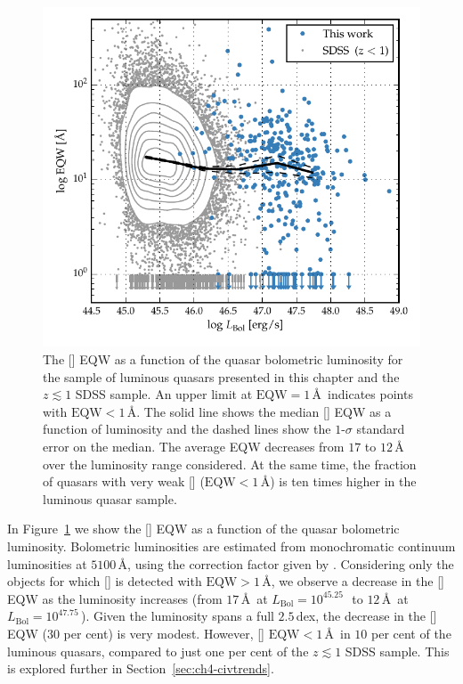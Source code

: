 \begin{figure}[t!]
\centering 
    \includegraphics[width=\columnwidth]{figures/chapter04/eqw_lum.pdf} 
    \caption[{The [] EQW as a function of the quasar bolometric luminosity.}]{The [] EQW as a function of the quasar bolometric luminosity for the sample of luminous quasars presented in this chapter and the $z\lesssim1$ SDSS sample. An upper limit at $\text{EQW}=1$\,\AA\, indicates points with $\text{EQW} < 1$\,\AA. The solid line shows the median [] EQW as a function of luminosity and the dashed lines show the $1$-$\sigma$ standard error on the median. The average EQW decreases from $17$ to $12$\,\AA\, over the luminosity range considered. At the same time, the fraction of quasars with very weak [] ($\text{EQW} < 1$\,\AA) is ten times higher in the luminous quasar sample.}     
    \label{fig:eqw_lum}
\end{figure}

In Figure~\ref{fig:eqw_lum} we show the [] EQW as a function of the quasar bolometric luminosity. 
Bolometric luminosities are estimated from monochromatic continuum luminosities at $5100$\,\AA, using the correction factor given by \citet{richards06}. 
Considering only the objects for which [] is detected with $\text{EQW} > 1$\,\AA, we observe a decrease in the [] EQW as the luminosity increases (from $17$\,\AA\, at $L_{\text{Bol}}=10^{45.25}$\,\ergs\, to $12$\,\AA\, at $L_{\text{Bol}}=10^{47.75}$\,\ergs). 
Given the luminosity spans a full $2.5$\,dex, the decrease in the [] EQW ($30$ per cent) is very modest.
However, [] $\text{EQW} < 1$\,\AA\, in $10$ per cent of the luminous quasars, compared to just one per cent of the $z \lesssim 1$ SDSS sample.
This is explored further in Section~\ref{sec:ch4-civtrends}.  

